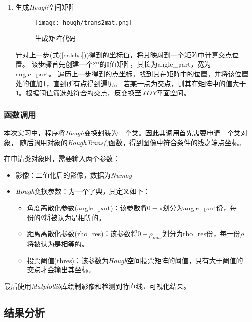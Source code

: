 \begin{enumerate}
            \item 生成\textit{Hough}空间矩阵
            
            \begin{figure}[H]
                \centering 
                \texttt{[image: hough/trans2mat.png]}
                \caption{生成矩阵代码}
                \label{hough_mat}
            \end{figure}

            针对上一步(式(\ref{calrho}))得到的坐标值，将其映射到一个矩阵中计算交点位置。
            该步骤首先创建一个空的0值矩阵，其长为angle\_part，宽为angle\_part。
            遍历上一步得到的点坐标，找到其在矩阵中的位置，并将该位置处的值加1，直到所有点得到遍历。
            若某一点为交点，则其在矩阵中的值大于1。根据阈值筛选处符合的交点，反变换至\textit{XOY}平面空间。


        \end{enumerate}

    \subsubsection{函数调用}
        本次实习中，程序将\textit{Hough}变换封装为一个类。因此其调用首先需要申请一个类对象，
        随后调用对象的\textit{HoughTrans()}函数，得到图像中符合条件的线之端点坐标。

        在申请类对象时，需要输入两个参数：
        \begin{itemize}
            \item 影像：二值化后的影像，数据为\textit{Numpy}
            \item \textit{Hough}变换参数：为一个字典，其定义如下：
            \begin{itemize}
                \item 角度离散化参数(angle\_part)：该参数将$0-\pi$划分为angle\_part份，每一份的$\theta$将被认为是相等的。
                \item 距离离散化参数(rho\_res)：该参数将$0-\rho_{max}$划分为rho\_res份，每一份$\rho$将被认为是相等的。
                \item 投票阈值(thres)：该参数为\textit{Hough}空间投票矩阵的阈值，只有大于阈值的交点才会输出其坐标。
            \end{itemize}
        \end{itemize}

        最后使用\textit{Matplotlib}库绘制影像和检测到特直线，可视化结果。

\subsection{结果分析}
